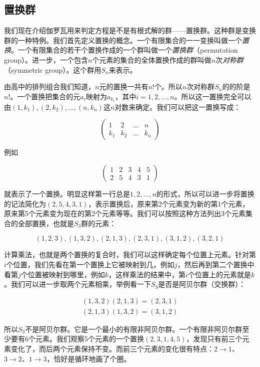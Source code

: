 \documentclass{article}
\begin{document}
\subsection{置换群}

我们现在介绍伽罗瓦用来判定方程是不是有根式解的群——置换群。这种群是变换群的一种特例。我们首先定义置换的概念。一个有限集合的一一变换叫做一个{\em 置换}。一个有限集合的若干个置换作成的一个群叫做一个{\em 置换群}（permutation group）。进一步，一个包含$n$个元素的集合的全体置换作成的群叫做$n$次{\em 对称群}（symmetric group）。这个群用$S_n$来表示。

由高中的排列组合我们知道，$n$元的置换一共有$n!$个。所以$n$次对称群$S_n$的的阶是$n!$。一个置换把集合的元$a_i$映射为$a_{k_i}$，其中$i = 1, 2, ..., n$。所以这一置换完全可以由$(1, k_1), (2, k_2), ..., (n, k_n)$这$n$对数来确定。我们可以把这一置换写成：

\[
\begin{pmatrix}
1 & 2 & ... & n \\
k_1 & k_2 & ... & k_n
\end{pmatrix}
\]

例如

\[
\begin{pmatrix}
1 & 2 & 3 & 4 & 5 \\
2 & 5 & 4 & 3 & 1
\end{pmatrix}
\]

就表示了一个置换。明显这样第一行总是$1, 2, ..., n$的形式，所以可以进一步将置换的记法简化为$(2, 5, 4, 3, 1)$，表示置换后，原来第2个元素变为新的第1个元素，原来第5个元素变为现在的第2个元素等等。我们可以按照这种方法列出3个元素集合的全部置换，也就是$S_3$群的元素：

\[
(1, 2, 3), (1, 3, 2), (2, 1, 3), (2, 3, 1), (3, 1, 2), (3, 2, 1)
\]

计算乘法，也就是两个置换的复合时，我们可以这样确定每个位置上元素。针对第$i$个位置，我们先看在第一个置换上它被映射到几，例如$j$，然后再到第二个置换中看第$j$个位置被映射到哪里，例如$k$，这样乘法的结果中，第$i$个位置上的元素就是$k$。我们可以进一步取两个元素相乘，举例看一下$S_3$是否是阿贝尔群（交换群）：

\[
\begin{array}{l}
(1, 3, 2) (2, 1, 3) = (2, 3, 1) \\
(2, 1, 3) (1, 3, 2) = (3, 1, 2)
\end{array}
\]

所以$S_3$不是阿贝尔群。它是一个最小的有限非阿贝尔群。一个有限非阿贝尔群至少要有6个元素。我们观察5个元素的一个置换$(2, 3, 1, 4, 5)$，发现只有前三个元素变化了，而后两个元素保持不变。而前三个元素的变化很有特点：$2 \to 1$、$3 \to 2$、$1 \to 3$，恰好是循环地画了个圈。
\end{document}
